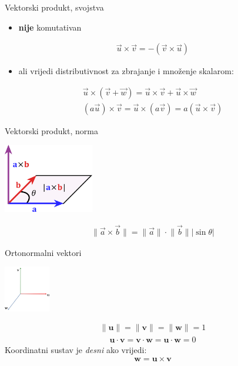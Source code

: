 \documentclass[9pt]{beamer}
\begin{document}
\begin{frame}{Vektorski produkt, svojstva}
	\begin{itemize}
		\item \textbf{nije} komutativan
	\end{itemize}
	\begin{align*}
	\vec{u} \times \vec{v} = -(\vec{v} \times \vec{u})
	\end{align*}
	\begin{itemize}
		\item ali vrijedi distributivnost za zbrajanje i množenje skalarom:
	\end{itemize}
	\begin{align*}
		\vec{u} \times (\vec{v} + \vec{w}) = \vec{u} \times \vec{v} + \vec{u} \times \vec{w} \\
		(a\vec{u}) \times \vec{v} = \vec{u} \times (a\vec{v}) = a (\vec{u} \times \vec{v})
	\end{align*}
\end{frame}

\begin{frame}{Vektorski produkt, norma}
	\begin{center}
		\includegraphics[height=3cm]{./slike/linear_algebra_cross_product_wiki.png}
	\end{center}

	\begin{align*}
	\lVert \vec{a} \times \vec{b} \rVert = \lVert \vec{a} \rVert \cdot \lVert \vec{b} \rVert |\sin \theta|
	\end{align*}
\end{frame}	

\begin{frame}{Ortonormalni vektori}
	\begin{center}
		\includegraphics[height=2cm]{./slike/ortonormalna_baza.png}
	\end{center}
	\begin{align*}
		\lVert \mathbf{u} \rVert = \lVert \mathbf{v} \rVert = \lVert \mathbf{w} \rVert = 1
	\end{align*}
	\begin{align*}
		 \mathbf{u} \cdot  \mathbf{v} =  \mathbf{v} \cdot  \mathbf{w} =  \mathbf{u} \cdot  \mathbf{w} = 0	
	\end{align*}
	Koordinatni sustav je \textit{desni} ako vrijedi: 
	\begin{align*}
	\mathbf{w} = \mathbf{u} \times  \mathbf{v}
	\end{align*}
\end{frame}
\end{document}
